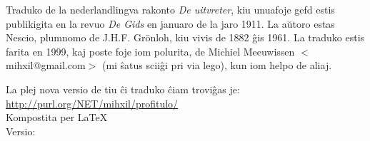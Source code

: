 \begin{minipage}[t]{\textwidth}
 Traduko de la nederlandlingva rakonto {\em De uitvreter}, kiu unuafoje
gefd estis publikigita en la revuo {\em De Gids} en januaro de la jaro
  1911. La a\u{u}toro estas Nescio, plumnomo de J.H.F. Gr\"onloh, kiu
  vivis de 1882 \^gis 1961.  La traduko estis farita  en 1999, kaj
  poste foje iom polurita,  de Michiel  Meeuwissen
  $<$mihxil@gmail.com$>$ (mi \^satus scii\^gi pri via lego), kun iom helpo de aliaj.

  La plej nova versio de tiu \^ci traduko \^ciam trovi\^gas je:\\
  \href{http://purl.org/NET/mihxil/profitulo/}{http://purl.org/NET/mihxil/profitulo/}\\

  Kompostita per \LaTeX\\
  Versio: 
\end{minipage}
